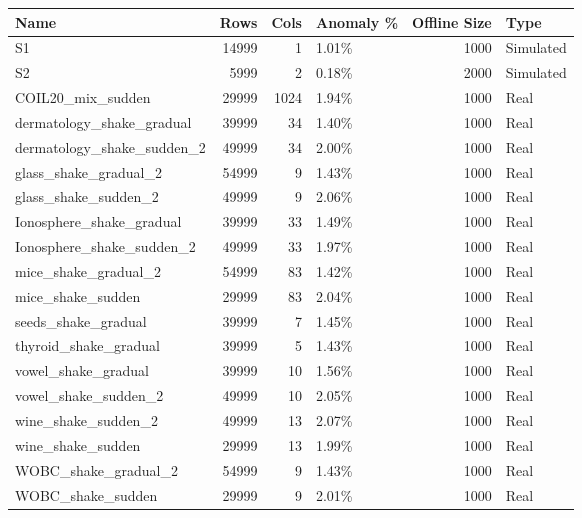 \begin{tabular}{lrrlrl}
\toprule
Name & Rows & Cols & Anomaly \% & Offline Size & Type \\
\midrule
S1 & 14999 & 1 & 1.01\% & 1000 & Simulated \\
S2 & 5999 & 2 & 0.18\% & 2000 & Simulated \\
COIL20\_mix\_sudden & 29999 & 1024 & 1.94\% & 1000 & Real \\
dermatology\_shake\_gradual & 39999 & 34 & 1.40\% & 1000 & Real \\
dermatology\_shake\_sudden\_2 & 49999 & 34 & 2.00\% & 1000 & Real \\
glass\_shake\_gradual\_2 & 54999 & 9 & 1.43\% & 1000 & Real \\
glass\_shake\_sudden\_2 & 49999 & 9 & 2.06\% & 1000 & Real \\
Ionosphere\_shake\_gradual & 39999 & 33 & 1.49\% & 1000 & Real \\
Ionosphere\_shake\_sudden\_2 & 49999 & 33 & 1.97\% & 1000 & Real \\
mice\_shake\_gradual\_2 & 54999 & 83 & 1.42\% & 1000 & Real \\
mice\_shake\_sudden & 29999 & 83 & 2.04\% & 1000 & Real \\
seeds\_shake\_gradual & 39999 & 7 & 1.45\% & 1000 & Real \\
thyroid\_shake\_gradual & 39999 & 5 & 1.43\% & 1000 & Real \\
vowel\_shake\_gradual & 39999 & 10 & 1.56\% & 1000 & Real \\
vowel\_shake\_sudden\_2 & 49999 & 10 & 2.05\% & 1000 & Real \\
wine\_shake\_sudden\_2 & 49999 & 13 & 2.07\% & 1000 & Real \\
wine\_shake\_sudden & 29999 & 13 & 1.99\% & 1000 & Real \\
WOBC\_shake\_gradual\_2 & 54999 & 9 & 1.43\% & 1000 & Real \\
WOBC\_shake\_sudden & 29999 & 9 & 2.01\% & 1000 & Real \\
\bottomrule
\end{tabular}
